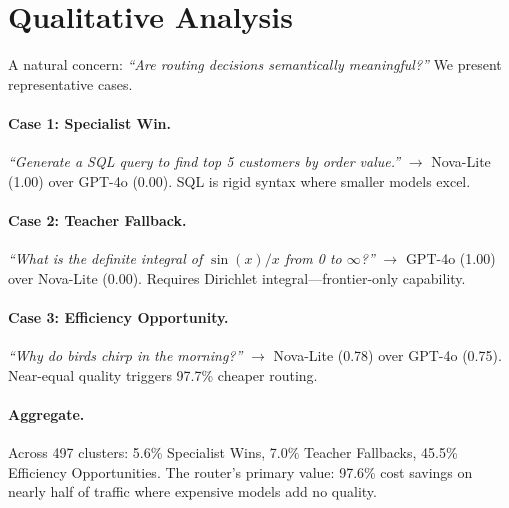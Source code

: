 
\section{Qualitative Analysis}
\label{sec:qualitative}

A natural concern: \emph{``Are routing decisions semantically meaningful?''} We present representative cases.

\paragraph{Case 1: Specialist Win.} \emph{``Generate a SQL query to find top 5 customers by order value.''} $\to$ Nova-Lite (1.00) over GPT-4o (0.00). SQL is rigid syntax where smaller models excel.

\paragraph{Case 2: Teacher Fallback.} \emph{``What is the definite integral of $\sin(x)/x$ from 0 to $\infty$?''} $\to$ GPT-4o (1.00) over Nova-Lite (0.00). Requires Dirichlet integral---frontier-only capability.

\paragraph{Case 3: Efficiency Opportunity.} \emph{``Why do birds chirp in the morning?''} $\to$ Nova-Lite (0.78) over GPT-4o (0.75). Near-equal quality triggers 97.7\% cheaper routing.

\paragraph{Aggregate.} Across 497 clusters: 5.6\% Specialist Wins, 7.0\% Teacher Fallbacks, 45.5\% Efficiency Opportunities. The router's primary value: 97.6\% cost savings on nearly half of traffic where expensive models add no quality.
